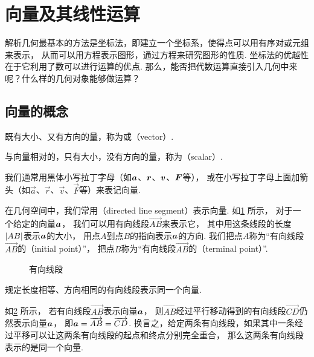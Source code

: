 \section{向量及其线性运算}
解析几何最基本的方法是坐标法，即建立一个坐标系，使得点可以用有序对或元组来表示，
从而可以用方程表示图形，通过方程来研究图形的性质.
坐标法的优越性在于它利用了数可以进行运算的优点.
那么，能否把代数运算直接引入几何中来呢？什么样的几何对象能够做运算？

\subsection{向量的概念}
既有大小、又有方向的量，称为或（vector）.

与向量相对的，只有大小，没有方向的量，称为（scalar）.

我们通常用黑体小写拉丁字母（如\(\boldsymbol{a}\)、\(\boldsymbol{r}\)、\(\boldsymbol{v}\)、\(\boldsymbol{F}\)等），
或在小写拉丁字母上面加箭头（如\(\vec{a}\)、\(\vec{r}\)、\(\vec{v}\)、\(\vec{F}\)等）来表记向量.

在几何空间中，我们常用（directed line segment）表示向量.
如\cref{figure:解析几何.有向线段} 所示，
对于一个给定的向量\(\boldsymbol{a}\)，
我们可以用有向线段\(\vec{AB}\)来表示它，
其中用这条线段的长度\(\abs{AB}\)表示\(\boldsymbol{a}\)的大小，
用点\(A\)到点\(B\)的指向表示\(\boldsymbol{a}\)的方向.
我们把点\(A\)称为“有向线段\(\vec{AB}\)的（initial point）”，
把点\(B\)称为“有向线段\(\vec{AB}\)的（terminal point）”.
\begin{figure}[htb]
\centering
{}
\caption{有向线段}
\label{figure:解析几何.有向线段}
\end{figure}

规定长度相等、方向相同的有向线段表示同一个向量.

如\cref{figure:解析几何.有向线段的平移不变性} 所示，
若有向线段\(\vec{AB}\)表示向量\(\boldsymbol{a}\)，
则\(\vec{AB}\)经过平行移动得到的有向线段\(\vec{CD}\)仍然表示向量\(\boldsymbol{a}\)，
即\(\boldsymbol{a} = \overrightarrow{AB} = \overrightarrow{CD}\).
换言之，给定两条有向线段，如果其中一条经过平移可以让这两条有向线段的起点和终点分别完全重合，
那么这两条有向线段表示的是同一个向量.
\begin{figure}[htb]
\centering
{}
\caption{}
\label{figure:解析几何.有向线段的平移不变性}
\end{figure}

